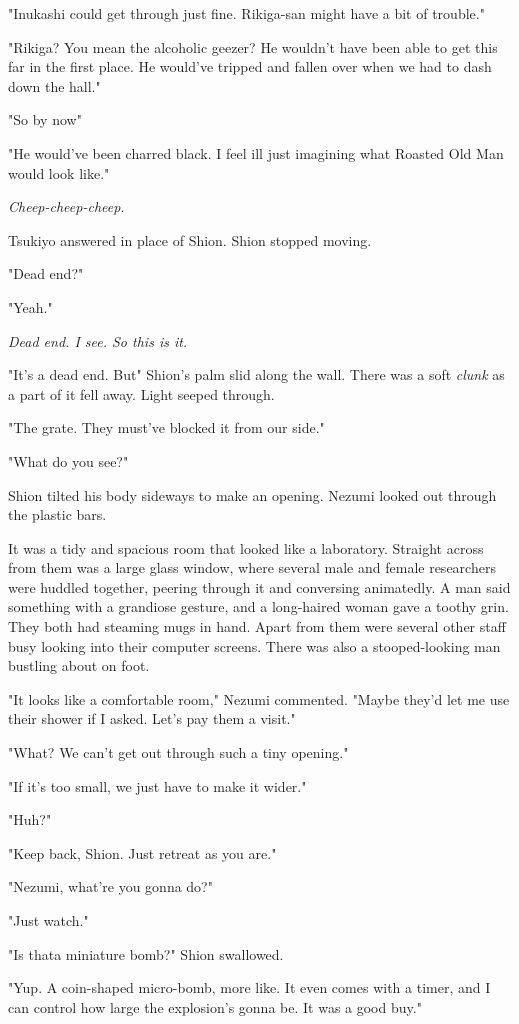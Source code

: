 "Inukashi could get through just fine. Rikiga-san might have a bit of
trouble."

"Rikiga? You mean the alcoholic geezer? He wouldn't have been able to
get this far in the first place. He would've tripped and fallen over
when we had to dash down the hall."

"So by now\el "

"He would've been charred black. I feel ill just imagining what Roasted
Old Man would look like."

\emph{Cheep-cheep-cheep.}

Tsukiyo answered in place of Shion. Shion stopped moving.

"Dead end?"

"Yeah."

\emph{Dead end. I see. So this is it.}

"It's a dead end. But\el " Shion's palm slid along the wall. There was a
soft \emph{clunk} as a part of it fell away. Light seeped through.

"The grate. They must've blocked it from our side."

"What do you see?"

Shion tilted his body sideways to make an opening. Nezumi looked out
through the plastic bars.

It was a tidy and spacious room that looked like a laboratory. Straight
across from them was a large glass window, where several male and female
researchers were huddled together, peering through it and conversing
animatedly. A man said something with a grandiose gesture, and a
long-haired woman gave a toothy grin. They both had steaming mugs in
hand. Apart from them were several other staff busy looking into their
computer screens. There was also a stooped-looking man bustling about on
foot.

"It looks like a comfortable room," Nezumi commented. "Maybe they'd let
me use their shower if I asked. Let's pay them a visit."

"What? We can't get out through such a tiny opening."

"If it's too small, we just have to make it wider."

"Huh?"

"Keep back, Shion. Just retreat as you are."

"Nezumi, what're you gonna do?"

"Just watch."

"Is that\el a miniature bomb?" Shion swallowed.

"Yup. A coin-shaped micro-bomb, more like. It even comes with a timer,
and I can control how large the explosion's gonna be. It was a good
buy."

